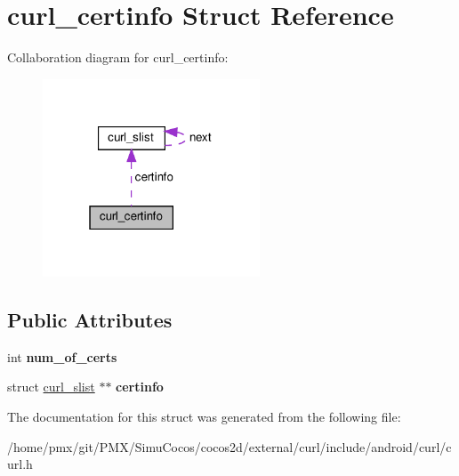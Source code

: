 \hypertarget{structcurl__certinfo}{}\section{curl\+\_\+certinfo Struct Reference}
\label{structcurl__certinfo}


Collaboration diagram for curl\+\_\+certinfo\+:
\nopagebreak
\begin{figure}[H]
\begin{center}
\leavevmode
\includegraphics[width=183pt]{structcurl__certinfo__coll__graph}
\end{center}
\end{figure}
\subsection*{Public Attributes}
\begin{DoxyCompactItemize}
\item 
\mbox{\label{structcurl__certinfo_a9eb8ef837e5a8ddb848ac7bae35ed92f}} 
int {\bfseries num\+\_\+of\+\_\+certs}
\item 
\mbox{\label{structcurl__certinfo_a21c05dec4b8e6356031ad4ca254a5104}} 
struct \hyperlink{structcurl__slist}{curl\+\_\+slist} $\ast$$\ast$ {\bfseries certinfo}
\end{DoxyCompactItemize}


The documentation for this struct was generated from the following file\+:\begin{DoxyCompactItemize}
\item 
/home/pmx/git/\+P\+M\+X/\+Simu\+Cocos/cocos2d/external/curl/include/android/curl/curl.\+h\end{DoxyCompactItemize}

